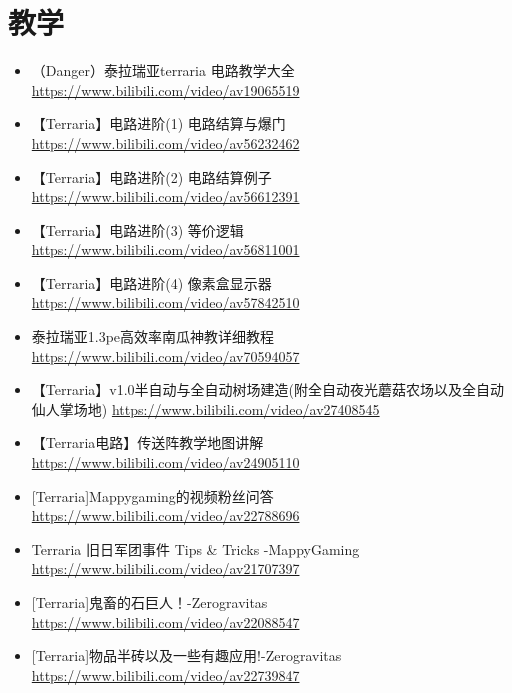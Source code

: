 \section{教学}
\begin{itemize}
\item （Danger）泰拉瑞亚terraria 电路教学大全 \url{https://www.bilibili.com/video/av19065519}
\item 【Terraria】电路进阶(1) 电路结算与爆门 \url{https://www.bilibili.com/video/av56232462}
\item 【Terraria】电路进阶(2) 电路结算例子 \url{https://www.bilibili.com/video/av56612391}
\item 【Terraria】电路进阶(3) 等价逻辑 \url{https://www.bilibili.com/video/av56811001}
\item 【Terraria】电路进阶(4) 像素盒显示器 \url{https://www.bilibili.com/video/av57842510}
\item 泰拉瑞亚1.3pe高效率南瓜神教详细教程 \url{https://www.bilibili.com/video/av70594057}
\item 【Terraria】v1.0半自动与全自动树场建造(附全自动夜光蘑菇农场以及全自动仙人掌场地) \url{https://www.bilibili.com/video/av27408545}
\item 【Terraria电路】传送阵教学地图讲解 \url{https://www.bilibili.com/video/av24905110}
\item {[}Terraria]Mappygaming的视频粉丝问答 \url{https://www.bilibili.com/video/av22788696}
\item Terraria 旧日军团事件 Tips \& Tricks -MappyGaming \url{https://www.bilibili.com/video/av21707397}
\item {[}Terraria]鬼畜的石巨人！-Zerogravitas \url{https://www.bilibili.com/video/av22088547}
\item {[}Terraria]物品半砖以及一些有趣应用!-Zerogravitas \url{https://www.bilibili.com/video/av22739847}
\end{itemize}

